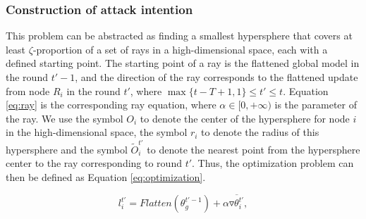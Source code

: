 \documentclass[lettersize,journal]{IEEEtran}
\begin{document}
\subsubsection{Construction of attack intention}


This problem can be abstracted as finding a smallest hypersphere that covers at least $\zeta$-proportion of a set of rays in a high-dimensional space, each with a defined starting point. The starting point of a ray is the flattened global model in the round $t'-1$, and the direction of the ray corresponds to the flattened update from node $R_i$ in the round $t'$, where $\max\{t-T+1, 1\}\leq t'\leq t$. Equation \ref{eq:ray} is the corresponding ray equation, where $\alpha\in [0, +\infty)$ is the parameter of the ray. 
We use the symbol $O_i$ to denote the center of the hypersphere for node $i$ in the high-dimensional space, the symbol $r_i$ to denote the radius of this hypersphere and the symbol $\tilde{O}_i^{t'}$ to denote the nearest point from the hypersphere center to the ray corresponding to round $t'$. Thus, the optimization problem can then be defined as Equation \ref{eq:optimization}.


\begin{equation}
l_i^{t'}=Flatten(\theta_g^{t'-1}) + \alpha \overline{\triangledown\theta_{i}^{t'}},
\label{eq:ray}
\end{equation}
\end{document}
